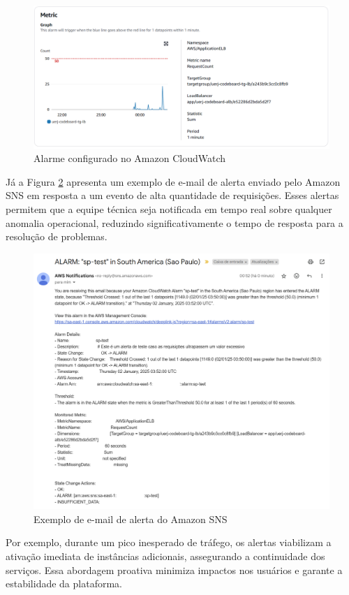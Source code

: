 \begin{figure}[H]
    \centering
    \includegraphics[width=1\textwidth]{assets/monitoring-test/cloudwatch-alarm-config.png}
    \caption{Alarme configurado no Amazon CloudWatch}
    \label{fig:cloudwatch-alarm-config}
\end{figure}

Já a Figura \ref{fig:cloudwatch-alarm-email} apresenta um exemplo de e-mail de alerta enviado pelo Amazon SNS em resposta a um evento de alta quantidade de requisições. Esses alertas permitem que a equipe técnica seja notificada em tempo real sobre qualquer anomalia operacional, reduzindo significativamente o tempo de resposta para a resolução de problemas.

\begin{figure}[H]
    \centering
    \includegraphics[width=1\textwidth]{assets/monitoring-test/cloudwatch-alarm-email.png}
    \caption{Exemplo de e-mail de alerta do Amazon SNS}
    \label{fig:cloudwatch-alarm-email}
\end{figure}

Por exemplo, durante um pico inesperado de tráfego, os alertas viabilizam a ativação imediata de instâncias adicionais, assegurando a continuidade dos serviços. Essa abordagem proativa minimiza impactos nos usuários e garante a estabilidade da plataforma.
